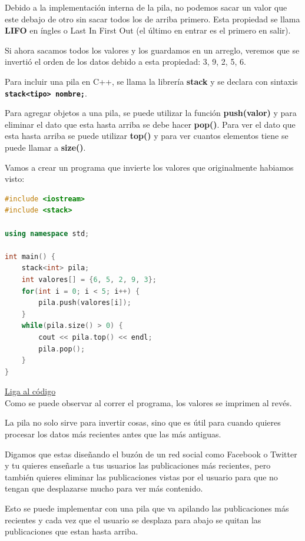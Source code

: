 \documentclass{article}
\begin{document}
Debido a la implementación interna de la pila, no podemos sacar un valor que este debajo de otro sin sacar todos los de arriba primero. Esta propiedad se llama \textbf{LIFO} en íngles o Last In First Out (el último en entrar es el primero en salir).

Si ahora sacamos todos los valores y los guardamos en un arreglo, veremos que se invertió el orden de los datos debido a esta propiedad: {3, 9, 2, 5, 6}.

Para incluir una pila en C++, se llama la librería \textbf{stack} y se declara con sintaxis \textbf{\lstinline{stack<tipo> nombre;}}.

Para agregar objetos a una pila, se puede utilizar la función \textbf{push(valor)} y para eliminar el dato que esta hasta arriba se debe hacer \textbf{pop()}. Para ver el dato que esta hasta arriba se puede utilizar \textbf{top()} y para ver cuantos elementos tiene se puede llamar a \textbf{size()}.

Vamos a crear un programa que invierte los valores que originalmente habiamos visto:

\begin{lstlisting}[language=C++, title=Pilas]
#include <iostream>
#include <stack>

using namespace std;

int main() {
	stack<int> pila;
	int valores[] = {6, 5, 2, 9, 3};
	for(int i = 0; i < 5; i++) {
		pila.push(valores[i]);
	}
	while(pila.size() > 0) {
		cout << pila.top() << endl;
		pila.pop();
	}
}
\end{lstlisting}
\href{https://repl.it/@Jamesscn/Cargando-pilas}{Liga al código} \\

Como se puede observar al correr el programa, los valores se imprimen al revés.

La pila no solo sirve para invertir cosas, sino que es útil para cuando quieres procesar los datos más recientes antes que las más antiguas.

Digamos que estas diseñando el buzón de un red social como Facebook o Twitter y tu quieres enseñarle a tus usuarios las publicaciones más recientes, pero también quieres eliminar las publicaciones vistas por el usuario para que no tengan que desplazarse mucho para ver más contenido.

Esto se puede implementar con una pila que va apilando las publicaciones más recientes y cada vez que el usuario se desplaza para abajo se quitan las publicaciones que estan hasta arriba.
\end{document}
